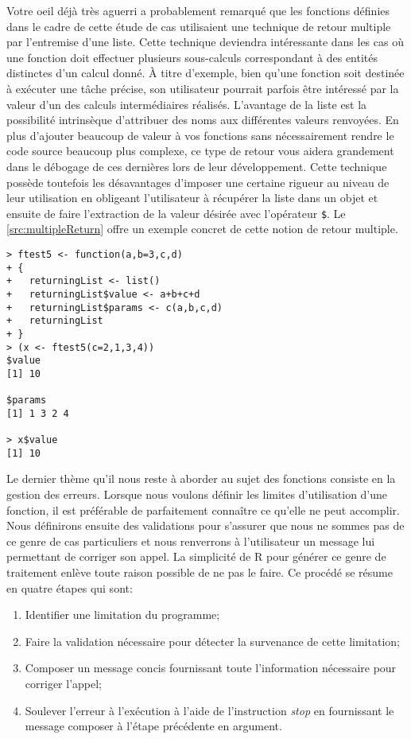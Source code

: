 \vspace{\baselineskip}
\noindent
Votre oeil déjà très aguerri a probablement remarqué que les fonctions définies dans le cadre de cette étude de cas utilisaient une technique de retour multiple par l'entremise d'une liste. Cette technique deviendra intéressante dans les cas où une fonction doit effectuer plusieurs sous-calculs correspondant à des entités distinctes d'un calcul donné. À titre d'exemple, bien qu'une fonction soit destinée à exécuter une tâche précise, son utilisateur pourrait parfois être intéressé par la valeur d'un des calculs intermédiaires réalisés. L'avantage de la liste est la possibilité intrinsèque d'attribuer des noms aux différentes valeurs renvoyées. En plus d'ajouter beaucoup de valeur à vos fonctions sans nécessairement rendre le code source beaucoup plus complexe, ce type de retour vous aidera grandement dans le débogage de ces dernières lors de leur développement. Cette technique possède toutefois les désavantages d'imposer une certaine rigueur au niveau de leur utilisation en obligeant l'utilisateur à récupérer la liste dans un objet et ensuite de faire l'extraction de la valeur désirée avec l'opérateur \texttt{\$}. Le \autoref{src:multipleReturn} offre un exemple concret de cette notion de retour multiple.

\begin{lstlisting}[caption = Retour multiple par l'entremise d'une liste,label=src:multipleReturn]
> ftest5 <- function(a,b=3,c,d)
+ {
+   returningList <- list()
+   returningList$value <- a+b+c+d
+   returningList$params <- c(a,b,c,d)
+   returningList
+ }
> (x <- ftest5(c=2,1,3,4))
$value
[1] 10

$params
[1] 1 3 2 4

> x$value
[1] 10
\end{lstlisting}

\vspace{\baselineskip}
\noindent
Le dernier thème qu'il nous reste à aborder au sujet des fonctions consiste en la gestion des erreurs. Lorsque nous voulons définir les limites d'utilisation d'une fonction, il est préférable de parfaitement connaître ce qu'elle ne peut accomplir. Nous définirons ensuite des validations pour s'assurer que nous ne sommes pas de ce genre de cas particuliers et nous renverrons à l'utilisateur un message lui permettant de corriger son appel. La simplicité de R pour générer ce genre de traitement enlève toute raison possible de ne pas le faire. Ce procédé se résume en quatre étapes qui sont:
\begin{enumerate}
	\item Identifier une limitation du programme;
	\item Faire la validation nécessaire pour détecter la survenance de cette limitation;
	\item Composer un message concis fournissant toute l'information nécessaire pour corriger l'appel;
	\item Soulever l'erreur à l'exécution à l'aide de l'instruction \emph{stop} en fournissant le message composer à l'étape précédente en argument.
\end{enumerate}

